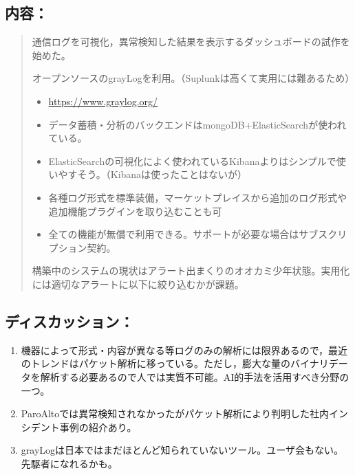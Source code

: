 \documentclass[letterpaper,10pt,dvipdfmx]{sphinxmanual}
\begin{document}
\subsection{内容：}
\label{minute-05-20160824:id4}\begin{quote}

通信ログを可視化，異常検知した結果を表示するダッシュボードの試作を始めた。

オープンソースのgrayLogを利用。（Suplunkは高くて実用には難あるため）
\begin{itemize}
\item {} 
\url{https://www.graylog.org/}

\item {} 
データ蓄積・分析のバックエンドはmongoDB+ElasticSearchが使われている。

\item {} 
ElasticSearchの可視化によく使われているKibanaよりはシンプルで使いやすそう。（Kibanaは使ったことはないが）

\item {} 
各種ログ形式を標準装備，マーケットプレイスから追加のログ形式や追加機能プラグインを取り込むことも可

\item {} 
全ての機能が無償で利用できる。サポートが必要な場合はサブスクリプション契約。

\end{itemize}

構築中のシステムの現状はアラート出まくりのオオカミ少年状態。実用化には適切なアラートに以下に絞り込むかが課題。
\end{quote}


\subsection{ディスカッション：}
\label{minute-05-20160824:id5}\begin{enumerate}
\item {} 
機器によって形式・内容が異なる等ログのみの解析には限界あるので，最近のトレンドはパケット解析に移っている。ただし，膨大な量のバイナリデータを解析する必要あるので人では実質不可能。AI的手法を活用すべき分野の一つ。

\item {} 
ParoAltoでは異常検知されなかったがパケット解析により判明した社内インシデント事例の紹介あり。

\item {} 
grayLogは日本ではまだほとんど知られていないツール。ユーザ会もない。先駆者になれるかも。

\end{enumerate}
\end{document}
